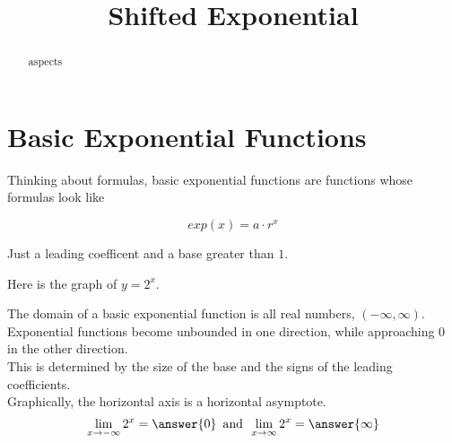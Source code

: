 \documentclass{ximera}
\title{Shifted Exponential}
\begin{document}
\begin{abstract}
aspects
\end{abstract}
\maketitle


\section*{Basic Exponential Functions}

Thinking about formulas, basic exponential functions are functions whose formulas look like

\[
exp(x) = a \cdot r^x
\]

Just a leading coefficent and a base greater than $1$. \\



\begin{example}

Here is the graph of $y = 2^x$.

\begin{image}
\end{image}


The domain of a basic exponential function is all real numbers, $(-\infty, \infty)$.  Exponential functions become unbounded in one direction, while approaching $0$ in the other direction. \\

This is determined by the size of the base and the signs of the leading coefficients. \\

Graphically, the horizontal axis is a horizontal asymptote.\\



\[  \lim_{x \to -\infty} 2^x = \answer{0}     \, \text{ and } \,  \lim_{x \to \infty} 2^x = \answer{\infty}   \]

\end{example}
\end{document}
